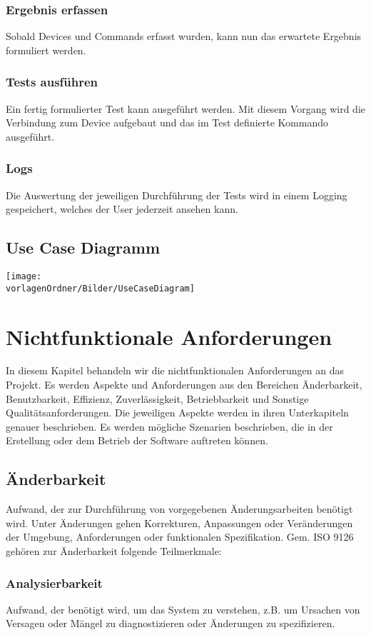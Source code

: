 \documentclass[
	ngerman,
	toc=listof, %
	toc=bibliography, %
	footnotes=multiple, %
	parskip=half, %
	numbers=noendperiod %
]{scrartcl}
\newcommand{\vorlagenOrdner}{../../99_Vorlagen} %
\begin{document}
		\subsubsection{Ergebnis erfassen}
			Sobald Devices und Commands erfasst wurden, kann nun das 
			erwartete Ergebnis formuliert werden.

		\subsubsection{Tests ausführen}
			Ein fertig formulierter Test kann ausgeführt werden. Mit diesem Vorgang wird die
			Verbindung zum Device aufgebaut und das im Test definierte Kommando ausgeführt.

		\subsubsection{Logs}
			Die Auswertung der jeweiligen Durchführung der Tests wird in einem Logging gespeichert, welches der User jederzeit ansehen kann.

	\subsection{Use Case Diagramm}
		\texttt{[image: \\vorlagenOrdner/Bilder/UseCaseDiagram]}

\section{Nichtfunktionale Anforderungen}
	In diesem Kapitel behandeln wir die nichtfunktionalen Anforderungen an das Projekt.
	Es werden Aspekte und Anforderungen aus den Bereichen Änderbarkeit, Benutzbarkeit, Effizienz, Zuverlässigkeit, Betriebbarkeit und Sonstige Qualitätsanforderungen.
	Die jeweiligen Aspekte werden in ihren Unterkapiteln genauer beschrieben.
	Es werden mögliche Szenarien beschrieben, die in der Erstellung oder dem Betrieb der Software auftreten können.

	\subsection{Änderbarkeit}
		Aufwand, der zur Durchführung von vorgegebenen Änderungsarbeiten benötigt wird.
		Unter Änderungen gehen Korrekturen, Anpassungen oder Veränderungen der Umgebung, Anforderungen oder funktionalen Spezifikation.
		Gem. ISO 9126 gehören zur Änderbarkeit folgende Teilmerkmale:
		\subsubsection{Analysierbarkeit}
			Aufwand, der benötigt wird, um das System zu verstehen, z.B. um Ursachen von Versagen oder Mängel zu diagnostizieren oder Änderungen zu spezifizieren.
\end{document}
